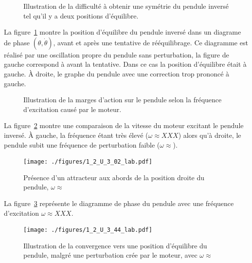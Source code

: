 \documentclass[a4paper,12pt,oneside]{article}
\begin{document}
\begin{figure}[!ht]
    \hfill
    \caption{Illustration de la difficulté à obtenir une symétrie du pendule inversé tel qu'il y a deux positions d'équilibre.}
    \label{fig:equilibre}
\end{figure}

La figure~\ref{fig:equilibre} montre la position d'équilibre du pendule inversé dans un diagrame de phase $(\theta,\dot{\theta})$, avant et après une tentative de rééquilibrage. Ce diagramme est réalisé par une oscillation propre du pendule sans perturbation, la figure de gauche correspond à avant la tentative. Dans ce cas la position d'équilibre était à gauche. À droite, le graphe du pendule avec une correction trop prononcé à gauche.

\begin{figure}[!ht]
    \hfill
    \caption{Illustration de la marges d'action sur le pendule selon la fréquence d'excitation causé par le moteur.}
    \label{fig:vitesse}
\end{figure}

La figure~\ref{fig:vitesse} montre une comparaison de la vitesse du moteur excitant le pendule inversé. À gauche, la fréquence étant très élevé ($\omega \approx XXX$) alors qu'à droite, le pendule subit une fréquence de perturbation faible ($\omega \approx$).

\begin{figure}[h!]
  \begin{center}
  \texttt{[image: ./figures/1\_2\_U\_3\_02\_lab.pdf]}
  \caption{Présence d'un attracteur aux abords de la position droite du pendule, $\omega \approx$} \label{fig:1_2_U_3_02_lab}
  \end{center}
\end{figure}

La figure~\ref{fig:1_2_U_3_02_lab} représente le diagramme de phase du pendule avec une fréquence d'excitation $\omega \approx XXX$.

\begin{figure}[h!]
  \begin{center}
  \texttt{[image: ./figures/1\_2\_U\_3\_44\_lab.pdf]}
  \caption{Illustration de la convergence vers une position d'équilibre du pendule, malgré une perturbation crée par le moteur, avec $\omega \approx$} \label{fig:1_2_U_3_44_lab}
  \end{center}
\end{figure}
\end{document}
